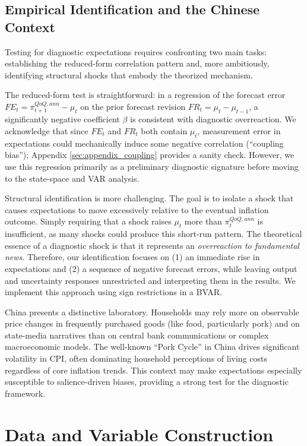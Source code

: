 \documentclass[12pt]{article}
\begin{document}
\subsection{Empirical Identification and the Chinese Context}
Testing for diagnostic expectations requires confronting two main tasks: establishing the reduced-form correlation pattern and, more ambitiously, identifying structural shocks that embody the theorized mechanism.

The reduced-form test is straightforward: in a regression of the forecast error $FE_t = \pi^{QoQ,ann}_{t+1} - \mu_t$ on the prior forecast revision $FR_t = \mu_t - \mu_{t-1}$, a significantly negative coefficient $\beta$ is consistent with diagnostic overreaction. We acknowledge that since $FE_t$ and $FR_t$ both contain $\mu_t$, measurement error in expectations could mechanically induce some negative correlation (``coupling bias''); Appendix \ref{sec:appendix_coupling} provides a sanity check. However, we use this regression primarily as a preliminary diagnostic signature before moving to the state-space and VAR analysis.

Structural identification is more challenging. The goal is to isolate a shock that causes expectations to move excessively relative to the eventual inflation outcome. Simply requiring that a shock raises $\mu_t$ more than $\pi^{QoQ,ann}_t$ is insufficient, as many shocks could produce this short-run pattern. The theoretical essence of a diagnostic shock is that it represents an \emph{overreaction to fundamental news}. Therefore, our identification focuses on (1) an immediate rise in expectations and (2) a sequence of negative forecast errors, while leaving output and uncertainty responses unrestricted and interpreting them in the results. We implement this approach using sign restrictions in a BVAR.

China presents a distinctive laboratory. Households may rely more on observable price changes in frequently purchased goods (like food, particularly pork) and on state-media narratives than on central bank communications or complex macroeconomic models. The well-known ``Pork Cycle'' in China drives significant volatility in CPI, often dominating household perceptions of living costs regardless of core inflation trends. This context may make expectations especially susceptible to salience-driven biases, providing a strong test for the diagnostic framework.

\section{Data and Variable Construction}\label{sec:data}
\end{document}

